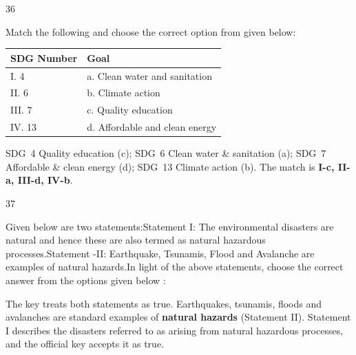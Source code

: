\begin{question}{36}
{Match the following and choose the correct option from given below:\par\smallskip\begin{tabularx}{\linewidth}{@{}>{\raggedright\arraybackslash}X>{\raggedright\arraybackslash}X@{}}\toprule
\textbf{SDG Number} & \textbf{Goal}\\\midrule
I. 4 & a. Clean water and sanitation\\
II. 6 & b. Climate action\\
III. 7 & c. Quality education\\
IV. 13 & d. Affordable and clean energy\\
\bottomrule\end{tabularx}\par\smallskip
\par}
\begin{explain}
SDG~4 Quality education (c); SDG~6 Clean water \& sanitation (a); SDG~7 Affordable \& clean energy (d); SDG~13 Climate action (b). The match is \textbf{I-c, II-a, III-d, IV-b}.
\end{explain}
\end{question}

\begin{question}{37}
{Given below are two statements:\newline Statement I: The environmental disasters are natural and hence these are also termed as natural hazardous processes.\newline Statement -II: Earthquake, Tsunamis, Flood and Avalanche are examples of natural hazards.\newline In light of the above statements, choose the correct answer from the options given below :\par}
\begin{explain}
The key treats both statements as true. Earthquakes, tsunamis, floods and avalanches are standard examples of \textbf{natural hazards} (Statement II). Statement I describes the disasters referred to as arising from natural hazardous processes, and the official key accepts it as true.
\end{explain}
\end{question}

